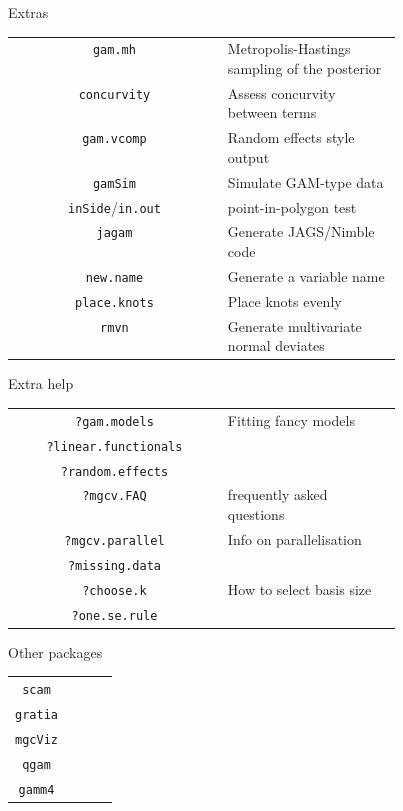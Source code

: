 
\begin{block}{Extras}
  \small\renewcommand{\arraystretch}{1.5}
  \begin{tabular}{c >{} p{0.45\linewidth}}
    \texttt{gam.mh} & Metropolis-Hastings sampling of the posterior\\
    \texttt{concurvity} & Assess concurvity between terms\\
    \texttt{gam.vcomp} & Random effects style output\\
    \texttt{gamSim} & Simulate GAM-type data\\
    \texttt{inSide}/\texttt{in.out} & point-in-polygon test\\
    \texttt{jagam} & Generate JAGS/Nimble code\\
    \texttt{new.name} & Generate a variable name\\
    \texttt{place.knots} & Place knots evenly\\
    \texttt{rmvn} & Generate multivariate normal deviates\\
  \end{tabular}
\end{block}

\begin{block}{Extra help}
  \small\renewcommand{\arraystretch}{1.5}
  \begin{tabular}{c >{} p{0.45\linewidth}}
    \texttt{?gam.models} & Fitting fancy models\\
    \texttt{?linear.functionals} & \\
    \texttt{?random.effects} & \\
    \texttt{?mgcv.FAQ} & frequently asked questions\\
    \texttt{?mgcv.parallel} & Info on parallelisation\\
    \texttt{?missing.data} & \\
    \texttt{?choose.k} & How to select basis size\\
    \texttt{?one.se.rule} & \\
  \end{tabular}
\end{block}


\begin{block}{Other packages}
  \small\renewcommand{\arraystretch}{1.5}
  \begin{tabular}{c >{} p{0.45\linewidth}}
    \texttt{scam} & \\
    \texttt{gratia} & \\
    \texttt{mgcViz} & \\
    \texttt{qgam} & \\
    \texttt{gamm4} & \\
  \end{tabular}
\end{block}


